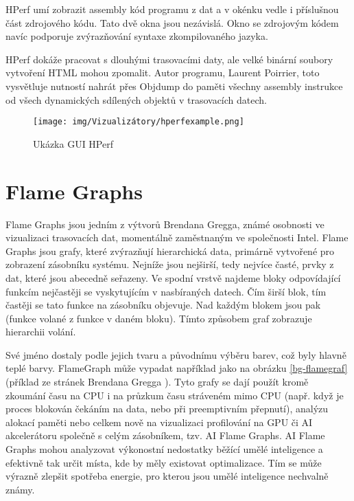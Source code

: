 HPerf umí zobrazit assembly kód programu z dat a v okénku vedle i příslušnou část zdrojového kódu. Tato dvě okna jsou nezávislá. Okno se zdrojovým kódem navíc podporuje zvýrazňování syntaxe zkompilovaného jazyka.

HPerf dokáže pracovat s dlouhými trasovacími daty, ale velké binární soubory vytvoření HTML mohou zpomalit. Autor programu, Laurent Poirrier, toto vysvětluje nutností nahrát přes Objdump do paměti všechny assembly instrukce od všech dynamických sdílených objektů v trasovacích datech.

\begin{figure}[p]\centering
    \texttt{[image: img/Vizualizátory/hperfexample.png]}
    \caption{Ukázka GUI HPerf}
    \label{hperfexample}
\end{figure}

\section{Flame Graphs}
\label{flamegrafy}

Flame Graphs \cite{FlameGraphs-GitHub} jsou jedním z výtvorů Brendana Gregga, známé osobnosti ve vizualizaci trasovacích dat, momentálně zaměstnaným ve společnosti Intel. Flame Graphs jsou grafy, které zvýrazňují hierarchická data, primárně vytvořené pro zobrazení zásobníku systému. Nejníže jsou nejširší, tedy nejvíce časté, prvky z dat, které jsou abecedně seřazeny. Ve spodní vrstvě najdeme bloky odpovídající funkcím nejčastěji se vyskytujícím v nasbíraných datech. Čím širší blok, tím častěji se tato funkce na zásobníku objevuje. Nad každým blokem jsou pak  (funkce volané z funkce v daném bloku). Tímto způsobem graf zobrazuje hierarchii volání.

Své jméno dostaly podle jejich tvaru a původnímu výběru barev, což byly hlavně teplé barvy. FlameGraph může vypadat například jako na obrázku \ref{bg-flamegraf} (příklad ze stránek Brendana Gregga \cite{FlameGraphs-Pages}). Tyto grafy se dají použít kromě zkoumání času na CPU i na průzkum času stráveném mimo CPU (např. když je proces blokován čekáním na data, nebo při preemptivním přepnutí), analýzu alokací paměti nebo celkem nově na vizualizaci profilování na GPU či AI akcelerátoru společně s celým zásobníkem, tzv. AI Flame Graphs. AI Flame Graphs mohou analyzovat výkonostní nedostatky běžící umělé inteligence a efektivně tak určit místa, kde by měly existovat optimalizace. Tím se může výrazně zlepšit spotřeba energie, pro kterou jsou umělé inteligence nechvalně známy.

